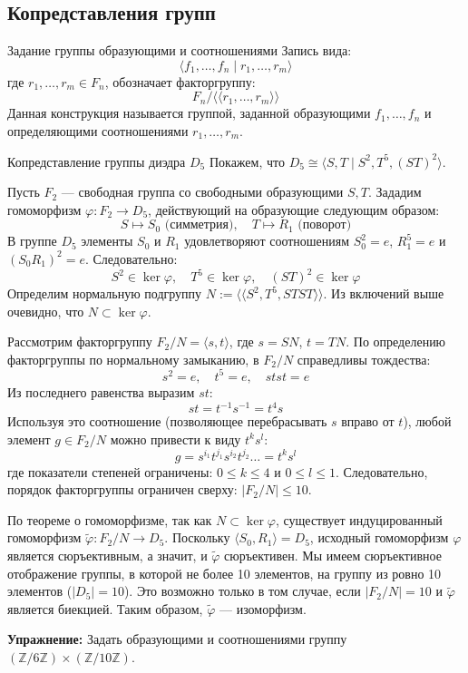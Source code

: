 \subsection{Копредставления групп}

\begin{Definition}{Задание группы образующими и соотношениями}{}
	Запись вида:
	\[ \langle f_1, \dots, f_n \mid r_1, \dots, r_m \rangle \]
	где $r_1, \dots, r_m \in F_n$, обозначает факторгруппу:
	\[ F_n / \langle\langle r_1, \dots, r_m \rangle\rangle \]
	Данная конструкция называется группой, заданной образующими $f_1, \dots, f_n$ и определяющими соотношениями $r_1, \dots, r_m$.
\end{Definition}

\begin{Example}{Копредставление группы диэдра $D_5$}{}
	Покажем, что $D_5 \cong \langle S, T \mid S^2, T^5, (ST)^2 \rangle$.
	
	Пусть $F_2$ — свободная группа со свободными образующими $S, T$. Зададим гомоморфизм $\varphi: F_2 \to D_5$, действующий на образующие следующим образом:
	\[ S \mapsto S_0 \text{ (симметрия)}, \quad T \mapsto R_1 \text{ (поворот)} \]
	В группе $D_5$ элементы $S_0$ и $R_1$ удовлетворяют соотношениям $S_0^2 = e$, $R_1^5 = e$ и $(S_0 R_1)^2 = e$. Следовательно:
	\[ S^2 \in \ker \varphi, \quad T^5 \in \ker \varphi, \quad (ST)^2 \in \ker \varphi \]
	Определим нормальную подгруппу $N := \langle\langle S^2, T^5, STST \rangle\rangle$. Из включений выше очевидно, что $N \subset \ker \varphi$.
	
	Рассмотрим факторгруппу $F_2 / N = \langle s, t \rangle$, где $s = SN$, $t = TN$. По определению факторгруппы по нормальному замыканию, в $F_2/N$ справедливы тождества:
	\[ s^2 = e, \quad t^5 = e, \quad stst = e \]
	Из последнего равенства выразим $st$:
	\[ st = t^{-1}s^{-1} = t^4 s \]
	Используя это соотношение (позволяющее перебрасывать $s$ вправо от $t$), любой элемент $g \in F_2 / N$ можно привести к виду $t^k s^l$:
	\[ g = s^{i_1} t^{j_1} s^{i_2} t^{j_2} \dots = t^k s^l \]
	где показатели степеней ограничены: $0 \le k \le 4$ и $0 \le l \le 1$. Следовательно, порядок факторгруппы ограничен сверху: $|F_2 / N| \le 10$.
	
	По теореме о гомоморфизме, так как $N \subset \ker \varphi$, существует индуцированный гомоморфизм $\widetilde{\varphi}: F_2 / N \to D_5$.
	Поскольку $\langle S_0, R_1 \rangle = D_5$, исходный гомоморфизм $\varphi$ является сюръективным, а значит, и $\widetilde{\varphi}$ сюръективен.
	Мы имеем сюръективное отображение группы, в которой не более 10 элементов, на группу из ровно 10 элементов ($|D_5| = 10$). Это возможно только в том случае, если $|F_2 / N| = 10$ и $\widetilde{\varphi}$ является биекцией.
	Таким образом, $\widetilde{\varphi}$ — изоморфизм.
	
	\textbf{Упражнение:} Задать образующими и соотношениями группу $(\mathbb{Z}/6\mathbb{Z}) \times (\mathbb{Z}/10\mathbb{Z})$.
\end{Example}

